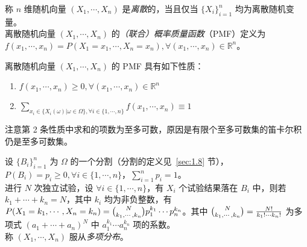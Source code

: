 \documentclass[../main.tex]{subfiles}
\begin{document}
\begin{definition}\label{def:3.2.1}
    称 $n$ 维随机向量 $(X_1,\cdots,X_n)$ 是\emph{离散}的，当且仅当 $\{X_i\}_{i=1}^n$ 均为离散随机变量。\\
    离散随机向量 $(X_1,\cdots,X_n)$ 的\emph{（联合）概率质量函数}（PMF）定义为 $f(x_1,\cdots,x_n)=P(X_1=x_1,\cdots,X_n=x_n),\forall(x_1,\cdots,x_n)\in \mathbb R^n$。
\end{definition}

\begin{proposition}
    离散随机向量 $(X_1,\cdots,X_n)$ 的 PMF 具有如下性质：
    \begin{enumerate}
        \item $f(x_1,\cdots,x_n)\geq0,\forall(x_1,\cdots,x_n)\in \mathbb R^n$
        \item $\sum_{x_i\in\{X_i(\omega)|\omega\in\Omega\},\forall i\in\{1,\cdots,n\}}f(x_1,\cdots,x_n)\equiv1$
    \end{enumerate}
\end{proposition}

注意第 2 条性质中求和的项数为至多可数，原因是有限个至多可数集的笛卡尔积仍是至多可数集。

\begin{example}
    设 $\{B_i\}_{i=1}^n$ 为 $\Omega$ 的一个分割（分割的定义见~\ref{sec:1.8} 节），$P(B_i)=p_i\geq0,\forall i\in\{1,\cdots,n\}$，$\sum_{i=1}^n p_i=1$。\\
    进行 $N$ 次独立试验，设 $\forall i\in\{1,\cdots,n\}$，有 $X_i$ 个试验结果落在 $B_i$ 中，则若 $k_1+\cdots+k_n=N$，其中 $k_i$ 均为非负整数，有 $P(X_1=k_1,\cdots,X_n=k_n)=\tbinom{N}{k_1,\cdots,k_n}p_1^{k_1}\cdots p_n^{k_n}$。其中 $\tbinom{N}{k_1,\cdots,k_n}=\frac{N!}{k_1!\cdots k_n!}$ 为多项式 $(a_1+\cdots+a_n)^N$ 中 $a_1^{k_1}\cdots a_n^{k_n}$ 项的系数。\\
    称 $(X_1,\cdots,X_n)$ 服从\emph{多项分布}。
\end{example}
\end{document}
